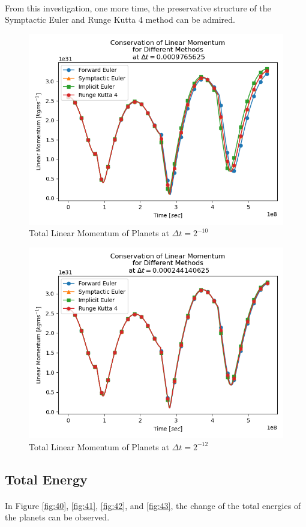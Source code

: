 \documentclass[letterpaper,12pt]{article}
\begin{document}
\paragraph{} From this investigation, one more time, the preservative structure of the Symptactic Euler and Runge Kutta 4 method can be admired. 
    \begin{figure}[H]
    \centerline{\includegraphics[width=0.6\linewidth]{figures/32.png}}
    \caption{Total Linear Momentum of Planets at $\Delta t = 2^{-10}$}
    \label{fig:32}
    \end{figure}
    
    \begin{figure}[H]
    \centerline{\includegraphics[width=0.7\linewidth]{figures/33.png}}
    \caption{Total Linear Momentum of Planets at $\Delta t = 2^{-12}$}
    \label{fig:33}
    \end{figure}

\subsection{Total Energy}

\paragraph{} In Figure \ref{fig:40}, \ref{fig:41}, \ref{fig:42}, and \ref{fig:43}, the change of the total energies of the planets can be observed.
\end{document}
